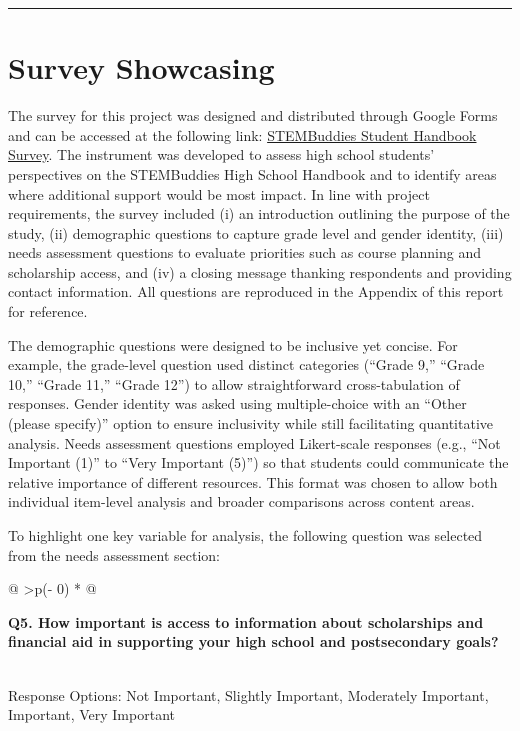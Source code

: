 \documentclass[
  letterpaper,
  DIV=11,
  numbers=noendperiod]{scrartcl}
\begin{document}
\begin{center}\rule{0.5\linewidth}{0.5pt}\end{center}

\section{Survey Showcasing}\label{survey-showcasing}

The survey for this project was designed and distributed through Google
Forms and can be accessed at the following link:
\href{https://docs.google.com/forms/d/1e35ZcuOUDe9IxB29tScLNolpVx3Be3VpC34lLpK_vlk}{STEMBuddies
Student Handbook Survey}. The instrument was developed to assess high
school students' perspectives on the STEMBuddies High School Handbook
and to identify areas where additional support would be most impact. In
line with project requirements, the survey included (i) an introduction
outlining the purpose of the study, (ii) demographic questions to
capture grade level and gender identity, (iii) needs assessment
questions to evaluate priorities such as course planning and scholarship
access, and (iv) a closing message thanking respondents and providing
contact information. All questions are reproduced in the Appendix of
this report for reference.

The demographic questions were designed to be inclusive yet concise. For
example, the grade-level question used distinct categories (``Grade 9,''
``Grade 10,'' ``Grade 11,'' ``Grade 12'') to allow straightforward
cross-tabulation of responses. Gender identity was asked using
multiple-choice with an ``Other (please specify)'' option to ensure
inclusivity while still facilitating quantitative analysis. Needs
assessment questions employed Likert-scale responses (e.g., ``Not
Important (1)'' to ``Very Important (5)'') so that students could
communicate the relative importance of different resources. This format
was chosen to allow both individual item-level analysis and broader
comparisons across content areas.

To highlight one key variable for analysis, the following question was
selected from the needs assessment section:

\begin{longtable}[]{@{}
  >{\centering\arraybackslash}p{(\columnwidth - 0\tabcolsep) * }@{}}
\toprule\noalign{}
\begin{minipage}[b]{\linewidth}\centering
\textbf{Q5. How important is access to information about scholarships
and financial aid in supporting your high school and postsecondary
goals?}
\end{minipage} \\
\midrule\noalign{}
\endhead
\bottomrule\noalign{}
\endlastfoot
Response Options: Not Important, Slightly Important, Moderately
Important, Important, Very Important \\
\end{longtable}
\end{document}
